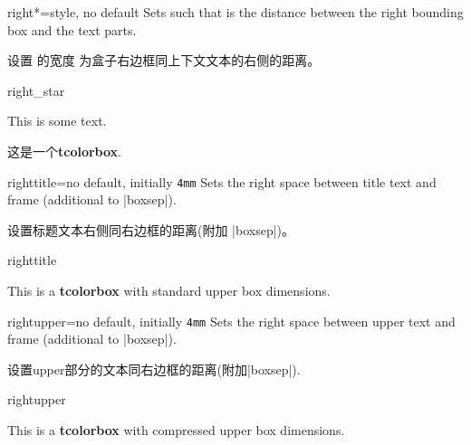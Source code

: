   
\begin{docTcbKey}[][doc new=2017-02-16]{right*}{=}{style, no default}
  Sets  such that  is the distance between
  the right bounding box and the text parts.

设置  的宽度  为盒子右边框同上下文文本的右侧的距离。
\begin{exdispExample}{right_star}

\flushright This is some text.
\begin{tcolorbox}[grow to right by=5mm,right*=0mm,
  halign=right,enhanced,show bounding box]
这是一个\textbf{tcolorbox}.
\end{tcolorbox}
\end{exdispExample}
\end{docTcbKey}



\begin{docTcbKey}{righttitle}{=}{no default, initially \texttt{4mm}}
  Sets the right space between title text and frame (additional to |boxsep|).

设置标题文本右侧同右边框的距离(附加 |boxsep|)。
  \begin{exdispExample}{righttitle}

\begin{tcolorbox}[width=5cm,righttitle=2cm,title=My very long title text]
This is a \textbf{tcolorbox} with standard upper box dimensions.
\end{tcolorbox}
\end{exdispExample}
\end{docTcbKey}


\begin{docTcbKey}{rightupper}{=}{no default, initially \texttt{4mm}}
  Sets the right space between upper text and frame (additional to |boxsep|).

设置upper部分的文本同右边框的距离(附加|boxsep|).
\begin{exdispExample}{rightupper}

\begin{tcolorbox}[width=5cm,rightupper=2cm,title=My very long title text]
This is a \textbf{tcolorbox} with compressed upper box dimensions.
\end{tcolorbox}
\end{exdispExample}
\end{docTcbKey}





